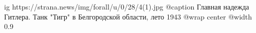  
 
 
 
 

\ifcmt
  ig https://strana.news/img/forall/u/0/28/4(1).jpg
	@caption Главная надежда Гитлера. Танк "Тигр" в Белгородской области, лето 1943
  @wrap center
  @width 0.9
\fi
